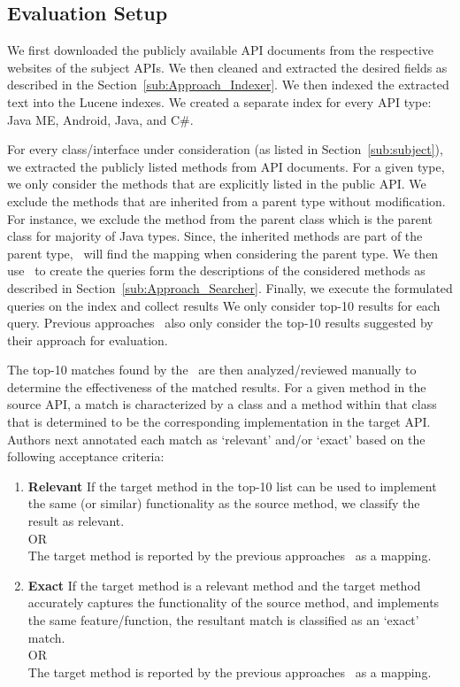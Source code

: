 \subsection{Evaluation Setup}


We first downloaded the publicly available API documents from the respective websites of the subject APIs. We then cleaned and extracted the desired fields as described in the Section~\ref{sub:Approach_Indexer}. We then indexed the extracted text into the Lucene indexes.
We created a separate index for every API type: Java ME, Android, Java, and C\#. 


For every class/interface under consideration (as listed in Section~\ref{sub:subject}),
we extracted the publicly listed methods from API documents.
For a given type, we only consider the methods that are explicitly listed in the public API.
We exclude the methods that are inherited from a parent type without modification.
For instance, we exclude the  method from the parent class  which is the parent class for majority of Java types.
Since, the inherited methods are part of the parent type,
\tool\ will find the mapping when considering the parent type.
We then use \tool\ to create the queries form the descriptions of the considered methods as described in Section~\ref{sub:Approach_Searcher}.
Finally, we execute the formulated queries on the index and collect results
We only consider top-10 results for each query.
Previous approaches~\cite{chatterjee2009sniff,Gokhale2013ICSE}
also only consider the top-10 results suggested by their approach for evaluation.


The top-10 matches found by the \tool\ are then analyzed/reviewed manually to determine the effectiveness of the matched results.
For a given method in the source API, a match is characterized by a class and a method within that class that is determined to be the corresponding implementation in the target API.
Authors next annotated each match as `relevant' and/or `exact' based on the following acceptance criteria:
\begin{enumerate}
	\item{\textbf{Relevant}} If the target method in the top-10 list can be used to implement the same (or similar) functionality as the source method, we classify the result as relevant.\\
	OR\\
	The target method is reported by the previous approaches~\cite{Gokhale2013ICSE,nguyen2014statistical} as a mapping.

	\item{\textbf{Exact}} If the target method is a relevant method and the target method accurately captures the functionality of the source method, and implements the same feature/function, the resultant match is classified as an `exact' match.\\
	OR\\
	The target method is reported by the previous approaches~\cite{Gokhale2013ICSE,nguyen2014statistical} as a mapping.
\end{enumerate}

